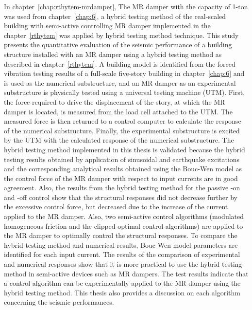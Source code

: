 In chapter~\ref{chap:rthytem-mrdamper}, The MR damper with the capacity of 1-ton was used from chapter~\ref{chap:6}, a hybrid testing method of the real-scaled building with semi-active controlling MR damper implemented in the chapter~\ref{rthytem} was applied by hybrid testing method technique. This study presents the quantitative evaluation of the seismic performance of a building structure installed with an MR damper using a hybrid testing method as described in chapter~\ref{rthytem}. A building model is identified from the forced vibration testing results of a full-scale five-story building in chapter~\ref{chap:6} and is used as the numerical substructure, and an MR damper as an experimental substructure is physically tested using a universal testing machine (UTM). First, the force required to drive the displacement of the story, at which the MR damper is located, is measured from the load cell attached to the UTM. The measured force is then returned to a control computer to calculate the response of the numerical substructure. Finally, the experimental substructure is excited by the UTM with the calculated response of the numerical substructure. The hybrid testing method implemented in this thesis is validated because the hybrid testing results obtained by application of sinusoidal and earthquake excitations and the corresponding analytical results obtained using the Bouc-Wen model as the control force of the MR damper with respect to input currents are in good agreement. Also, the results from the hybrid testing method for the passive -on and -off control show that the structural responses did not decrease further by the excessive control force, but decreased due to the increase of the current applied to the MR damper. Also, two semi-active control algorithms (modulated homogeneous friction and the clipped-optimal control algorithms) are applied to the MR damper to optimally control the structural responses. To compare the hybrid testing method and numerical results, Bouc-Wen model parameters are identified for each input current. The results of the comparison of experimental and numerical responses show that it is more practical to use the hybrid testing method in semi-active devices such as MR dampers. The test results indicate that a control algorithm can be experimentally applied to the MR damper using the hybrid testing method. This thesis also provides a discussion on each algorithm concerning the seismic performances.

